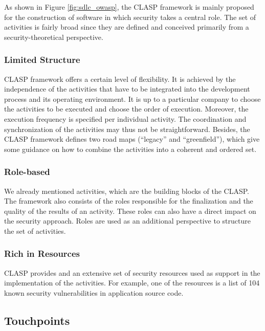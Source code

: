 \documentclass[12pt,a4,twoside]{article}
\begin{document}
As shown in Figure \ref{fig:sdlc_owasp}, the CLASP framework is mainly proposed for the construction of software in which security takes a central role. The set of activities is fairly broad since they are defined and conceived primarily from a security-theoretical perspective.

\subsubsection{Limited Structure}

CLASP framework offers a certain level of flexibility. It is achieved by the independence of the activities that have to be integrated into the development process and its operating environment. It is up to a particular company to choose the activities to be executed and choose the order of execution. Moreover, the execution frequency is specified per individual activity. The coordination and synchronization of the activities may thus not be straightforward. Besides, the CLASP framework defines two road maps (``legacy'' and ``greenfield''), which give some guidance on how to combine the activities into a coherent and ordered set.

\subsubsection{Role-based}

We already mentioned activities, which are the building blocks of the CLASP. The framework also consists of the roles responsible for the finalization and the quality of the results of an activity. These roles can also have a direct impact on the security approach. Roles are used as an additional perspective to structure the set of activities.

\subsubsection{Rich in Resources}

CLASP provides and an extensive set of security resources used as support in the implementation of the activities. For example, one of the resources is a list of 104 known security vulnerabilities in application source code.

\subsection{Touchpoints \cite{on_secure_software}}
\end{document}
